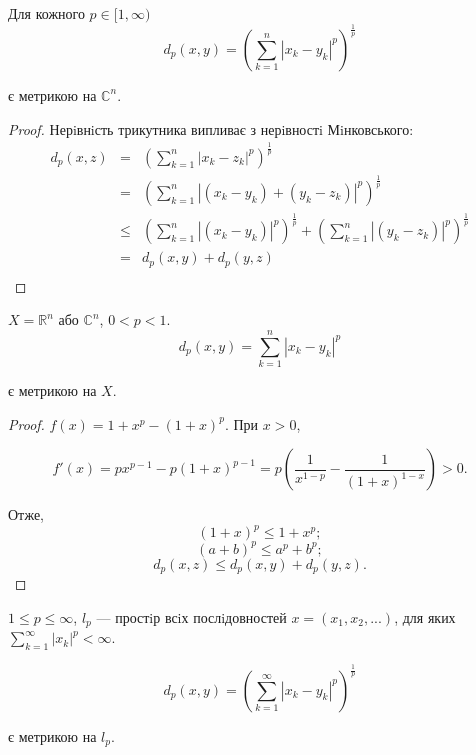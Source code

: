 \begin{theorem}
    Для кожного $p \in [1, \infty)$
    $$d_p(x, y) = \left( \sum\limits_{k=1}^{n} |x_k - y_k|^p \right)^{\frac{1}{p}}$$
    
    є метрикою на $\mathbb{C}^n$.
\end{theorem}
\begin{proof}
    Нерiвнiсть трикутника випливає з нерiвностi Мiнковського:
    $$\begin{array}{rcl}
        d_p(x, z)
        & = & \left( \sum\limits_{k=1}^{n} |x_k - z_k|^p \right)^{\frac{1}{p}}  \\
        & = & \left( \sum\limits_{k=1}^{n} |(x_k - y_k) + (y_k - z_k)|^p \right)^{\frac{1}{p}}  \\
        & \leqslant & \left( \sum\limits_{k=1}^{n} |(x_k - y_k)|^p \right)^{\frac{1}{p}}
            + \left( \sum\limits_{k=1}^{n} |(y_k - z_k)|^p \right)^{\frac{1}{p}}  \\
        & = & d_p(x, y) + d_p(y, z)  \\
    \end{array}$$
\end{proof}

\begin{example}
    $X = \mathbb{R}^n$ або $\mathbb{C}^n$, $0 < p < 1$.
    $$d_p(x, y)
    = \sum\limits_{k=1}^n |x_k - y_k|^p$$
    
    є метрикою на $X$.
    
    \begin{proof}
        $f(x) = 1 + x^p - (1 + x)^p$. При $x > 0$,
        
        $$f'(x)
        = p x^{p-1} - p(1 + x)^{p-1}
        = p \left(\dfrac{1}{x^{1-p}} - \dfrac{1}{(1+x)^{1-x}} \right)
        > 0.$$
        
        Отже,
        $$(1 + x)^p \leqslant 1 + x^p;$$
        $$(a + b)^p \leqslant a^p + b^p;$$
        $$d_p(x, z) \leqslant d_p(x, y) + d_p(y, z).$$
    \end{proof}
\end{example}

\begin{example}
    $1 \leqslant p \leqslant \infty$, $l_p$ --- простiр всiх
    послiдовностей $x = (x_1, x_2, ...)$, для яких
    $\sum\limits_{k=1}^{\infty} |x_k|^p < \infty$.
    
    $$d_p(x, y) = \left( \sum\limits_{k=1}^{\infty} |x_k - y_k|^p \right)^{\frac{1}{p}}$$
    
    є метрикою на $l_p$.
\end{example}

